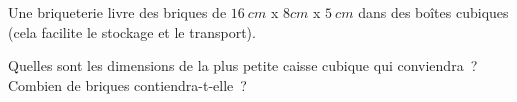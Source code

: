 %
%
Une briqueterie livre des briques de $16\ cm$ x $8cm$ x $5\ cm$ dans des boîtes cubiques (cela facilite le stockage et le transport).
    \begin{tasks}
        \task Quelles sont les dimensions de la plus petite caisse cubique qui conviendra~?
        \task Combien de briques contiendra-t-elle~?
    \end{tasks}
